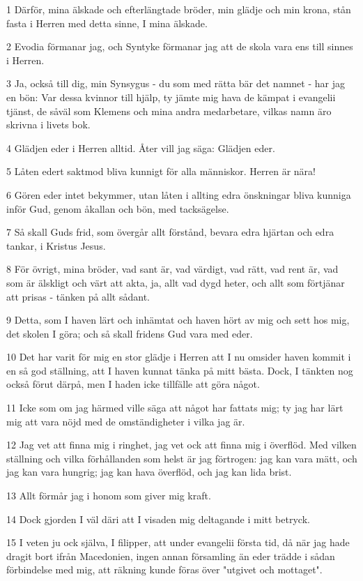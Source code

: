 \par 1 Därför, mina älskade och efterlängtade bröder, min glädje och min krona, stån fasta i Herren med detta sinne, I mina älskade.
\par 2 Evodia förmanar jag, och Syntyke förmanar jag att de skola vara ens till sinnes i Herren.
\par 3 Ja, också till dig, min Synsygus - du som med rätta bär det namnet - har jag en bön: Var dessa kvinnor till hjälp, ty jämte mig hava de kämpat i evangelii tjänst, de såväl som Klemens och mina andra medarbetare, vilkas namn äro skrivna i livets bok.
\par 4 Glädjen eder i Herren alltid. Åter vill jag säga: Glädjen eder.
\par 5 Låten edert saktmod bliva kunnigt för alla människor. Herren är nära!
\par 6 Gören eder intet bekymmer, utan låten i allting edra önskningar bliva kunniga inför Gud, genom åkallan och bön, med tacksägelse.
\par 7 Så skall Guds frid, som övergår allt förstånd, bevara edra hjärtan och edra tankar, i Kristus Jesus.
\par 8 För övrigt, mina bröder, vad sant är, vad värdigt, vad rätt, vad rent är, vad som är älskligt och värt att akta, ja, allt vad dygd heter, och allt som förtjänar att prisas - tänken på allt sådant.
\par 9 Detta, som I haven lärt och inhämtat och haven hört av mig och sett hos mig, det skolen I göra; och så skall fridens Gud vara med eder.
\par 10 Det har varit för mig en stor glädje i Herren att I nu omsider haven kommit i en så god ställning, att I haven kunnat tänka på mitt bästa. Dock, I tänkten nog också förut därpå, men I haden icke tillfälle att göra något.
\par 11 Icke som om jag härmed ville säga att något har fattats mig; ty jag har lärt mig att vara nöjd med de omständigheter i vilka jag är.
\par 12 Jag vet att finna mig i ringhet, jag vet ock att finna mig i överflöd. Med vilken ställning och vilka förhållanden som helst är jag förtrogen: jag kan vara mätt, och jag kan vara hungrig; jag kan hava överflöd, och jag kan lida brist.
\par 13 Allt förmår jag i honom som giver mig kraft.
\par 14 Dock gjorden I väl däri att I visaden mig deltagande i mitt betryck.
\par 15 I veten ju ock själva, I filipper, att under evangelii första tid, då när jag hade dragit bort ifrån Macedonien, ingen annan församling än eder trädde i sådan förbindelse med mig, att räkning kunde föras över "utgivet och mottaget".
